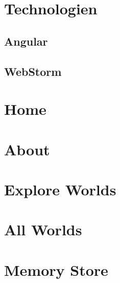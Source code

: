 
\section{Technologien}

\subsection{Angular}

\subsection{WebStorm}


\section{Home}

\section{About}

\section{Explore Worlds}

\section{All Worlds}

\section{Memory Store}
